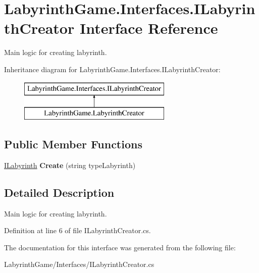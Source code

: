\hypertarget{interface_labyrinth_game_1_1_interfaces_1_1_i_labyrinth_creator}{\section{Labyrinth\+Game.\+Interfaces.\+I\+Labyrinth\+Creator Interface Reference}
\label{interface_labyrinth_game_1_1_interfaces_1_1_i_labyrinth_creator}
}


Main logic for creating labyrinth.  


Inheritance diagram for Labyrinth\+Game.\+Interfaces.\+I\+Labyrinth\+Creator\+:\begin{figure}[H]
\begin{center}
\leavevmode
\includegraphics[height=2.000000cm]{interface_labyrinth_game_1_1_interfaces_1_1_i_labyrinth_creator}
\end{center}
\end{figure}
\subsection*{Public Member Functions}
\begin{DoxyCompactItemize}
\item 
\hypertarget{interface_labyrinth_game_1_1_interfaces_1_1_i_labyrinth_creator_a334f9f215d40d3854ad00f36645c347c}{\hyperlink{interface_labyrinth_game_1_1_interfaces_1_1_i_labyrinth}{I\+Labyrinth} {\bfseries Create} (string type\+Labyrinth)}\label{interface_labyrinth_game_1_1_interfaces_1_1_i_labyrinth_creator_a334f9f215d40d3854ad00f36645c347c}

\end{DoxyCompactItemize}


\subsection{Detailed Description}
Main logic for creating labyrinth. 



Definition at line 6 of file I\+Labyrinth\+Creator.\+cs.



The documentation for this interface was generated from the following file\+:\begin{DoxyCompactItemize}
\item 
Labyrinth\+Game/\+Interfaces/I\+Labyrinth\+Creator.\+cs\end{DoxyCompactItemize}
